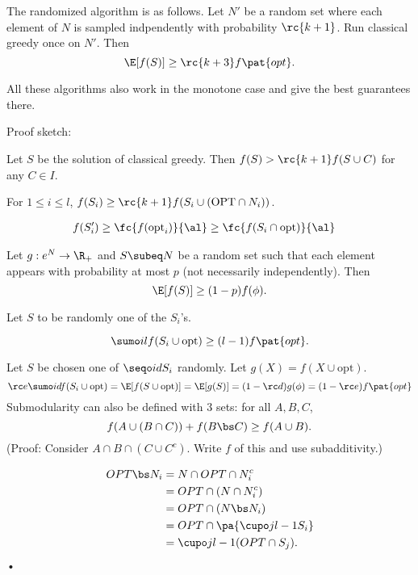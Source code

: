 The randomized algorithm is as follows.
Let $N'$ be a random set where each element of $N$ is sampled indpendently with probability $\rc{k+1}$. 
Run classical greedy once on $N'$. Then
$$
\E[f(S)]\ge \rc{k+3} f\pat{opt}.
$$

All these algorithms also work in the  monotone case and give the best guarantees there.

Proof sketch:

\begin{lem}[Gupta 10]
Let $S$ be the solution of classical greedy. Then $f(S)>\rc{k+1} f(S\cup C)$ for any $C\in I$. 
\end{lem}

\begin{lem}
For $1\le i\le l$, $f(S_i) \ge \rc{k+1} f(S_i \cup (\text{OPT}\cap N_i))$.
\end{lem}

\begin{lem}
\begin{align}
f(S_i') & \ge\fc{f(\text{opt}_i)}{\al} \ge \fc{f(S_i\cap \text{opt})}{\al}
\end{align}
\end{lem}

\begin{lem}
Let $g:e^N\to \R_+$ and $S\subeq N$ be a random set such that each element appears with probability at most $p$ (not necessarily independently). Then
$$
\E[f(S)]\ge (1-p)f(\phi).
$$
\end{lem}
Let $S$ to be randomly one of the $S_i$'s.
\begin{lem}
$$
\sumo il f(S_i\cup \text{opt}) \ge (l-1)f\pat{opt}.
$$
\end{lem}
Let $S$ be chosen one of $\seqo id{S_i}$ randomly.  Let $g(X) = f(X\cup \text{opt})$.
$$
\rc e\sumo id f(S_i\cup \text{opt}) = \E[f(S\cup \text{opt})] = \E[g(S)] = (1-\rc d)g(\phi) = (1-\rc e)f\pat{opt}
$$
Submodularity can also be defined with 3 sets: for all $A,B,C$,
$$
f(A\cup (B\cap C)) + f(B \bs C) \ge f(A\cup B).
$$
(Proof: Consider $A\cap B\cap (C\cup C^c)$. Write $f$ of this and use subadditivity.)

\begin{align}
OPT\bs N_i &= N\cap OPT\cap N_i^c\\
&=OPT\cap (N\cap N_i^c)\\
&=OPT\cap (N\bs N_i)\\
&=OPT\cap \pa{\cupo j{l-1} S_i}\\
&=\cupo j{l-1} (OPT\cap S_j).
\end{align}•

